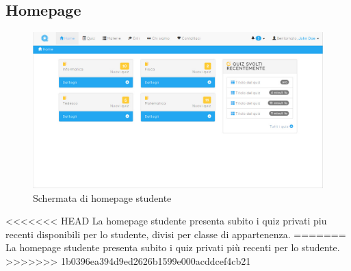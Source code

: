 \documentclass[a4paper, titlepage]{article}
\begin{document}
	 \subsection{Homepage}
	 \begin{figure}[!h]
	 	\centering
	 	\includegraphics[scale=0.33]{Img/screen_HomepageStudente.png}
	 	\caption{Schermata di homepage studente}
	 \end{figure}
<<<<<<< HEAD
	 La homepage studente presenta subito i quiz privati piu recenti disponibili per lo studente, divisi per classe di appartenenza.
=======
	 La homepage studente presenta subito i quiz privati più recenti per lo studente.
>>>>>>> 1b0396ea394d9ed2626b1599e000acddcef4cb21
	 
	 \newpage
\end{document}
